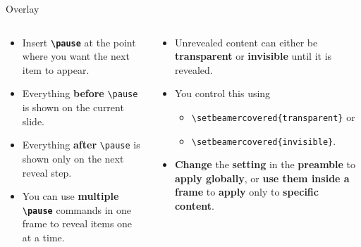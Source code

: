 \documentclass[aspectratio=169]{beamer}
\begin{document}
\begin{frame}{Overlay}
    \pause
    \vspace{0.3cm}
    \begin{columns}
        \begin{column}{0.49\textwidth}
            \begin{coloredblock}
                \begin{itemize}
                    \item \footnotesize Insert \textbf{\texttt{\textbackslash pause}} at the point where you want the next item to appear.
                    \item \footnotesize Everything \textbf{before} \texttt{\textbackslash pause} is shown on the current slide.
                    \item \footnotesize Everything \textbf{after} \texttt{\textbackslash pause} is shown only on the next reveal step.
                    \item \footnotesize You can use \textbf{multiple \texttt{\textbackslash pause}} commands in one frame to reveal items one at a time.
                \end{itemize}
            \end{coloredblock}
        \end{column}
        \begin{column}{0.49\textwidth}
            \pause
                \begin{coloredblock}
                    \begin{itemize}
                       \item \footnotesize Unrevealed content can either be \textbf{transparent} or \textbf{invisible} until it is revealed.
                        \item \footnotesize You control this using 
                        \begin{itemize}
                            \item \texttt{\textbackslash setbeamercovered\{transparent\}} or
                            \item \texttt{\textbackslash setbeamercovered\{invisible\}}.
                        \end{itemize}
                        \item \footnotesize \textbf{Change} the \textbf{setting} in the \textbf{preamble} to \textbf{apply globally}, or \textbf{use them inside a frame} to \textbf{apply} only to \textbf{specific content}.
                    \end{itemize}
                \end{coloredblock}
            \end{column}
        \end{columns}

\end{frame}
\end{document}

